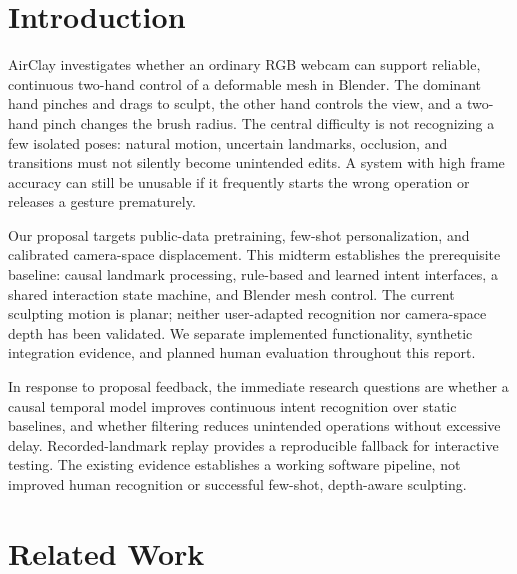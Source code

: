 \documentclass{article}
\newif\ifdraftnotes
\newcommand{\workitem}[7]{%
  \ifdraftnotes
  \begin{tcolorbox}[title={#1},title after break={#1 (continued)}]
  \textbf{Owner: }#2\par
  \textbf{Task: }#3\par
  \textbf{Protocol: }#4\par
  \textbf{Deliverables: }#5\par
  \textbf{Fill here: }#6\par
  \textbf{Done when: }#7
  \end{tcolorbox}
  \fi}
\begin{document}
\section{Introduction}
AirClay investigates whether an ordinary RGB webcam can support reliable, continuous
two-hand control of a deformable mesh in Blender. The dominant hand pinches and drags
to sculpt, the other hand controls the view, and a two-hand pinch changes the brush
radius. The central difficulty is not recognizing a few isolated poses: natural
motion, uncertain landmarks, occlusion, and transitions must not silently become
unintended edits. A system with high frame accuracy can still be unusable if it
frequently starts the wrong operation or releases a gesture prematurely.

Our proposal targets public-data pretraining, few-shot personalization, and calibrated
camera-space displacement. This midterm establishes the prerequisite baseline:
causal landmark processing, rule-based and learned intent interfaces, a shared
interaction state machine, and Blender mesh control. The current sculpting motion
is planar; neither user-adapted recognition nor camera-space depth has been validated.
We separate implemented functionality, synthetic integration evidence, and planned
human evaluation throughout this report.

In response to proposal feedback, the immediate research questions are whether a
causal temporal model improves continuous intent recognition over static baselines,
and whether filtering reduces unintended operations without excessive delay.
Recorded-landmark replay provides a reproducible fallback for interactive testing.
The existing evidence establishes a working software pipeline, not improved human
recognition or successful few-shot, depth-aware sculpting.

\workitem{I1 | Base the conclusions on the results}
{E; each experiment owner contributes one finding.}
{After completing the tables, update the final paragraph of this section to summarize what was actually found.}
{Keep the research questions open until measured. Do not prewrite claims that TCN is better, Kalman filtering works, or the real-time targets have been met.}
{Two or three summary sentences, each supported by a table or a documented failure case.}
{Replace the final two sentences of this section and update the Discussion consistently.}
{Friday, Oct. 23: the results, summary, and completion status agree.}

\section{Related Work}
\end{document}

